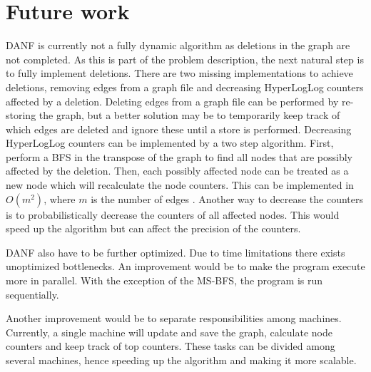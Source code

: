 \section{Future work}
\label{sec:future_work}
DANF is currently not a fully dynamic algorithm as deletions in the graph are not completed. As this is part of the problem description, the next natural step is to fully implement deletions. There are two missing implementations to achieve deletions, removing edges from a graph file and decreasing HyperLogLog counters affected by a deletion. Deleting edges from a graph file can be performed by re-storing the graph, but a better solution may be to temporarily keep track of which edges are deleted and ignore these until a store is performed. Decreasing HyperLogLog counters can be implemented by a two step algorithm. First, perform a BFS in the transpose of the graph to find all nodes that are possibly affected by the deletion. Then, each possibly affected node can be treated as a new node which will recalculate the node counters. This can be implemented in $O(m^2)$, where $m$ is the number of edges . Another way to decrease the counters is to probabilistically decrease the counters of all affected nodes. This would speed up the algorithm but can affect the precision of the counters.

DANF also have to be further optimized. Due to time limitations there exists unoptimized bottlenecks. An improvement would be to make the program execute more in parallel. With the exception of the MS-BFS, the program is run sequentially. 

Another improvement would be to separate responsibilities among machines. Currently, a single machine will update and save the graph, calculate node counters and keep track of top counters. These tasks can be divided among several machines, hence speeding up the algorithm and making it more scalable. 